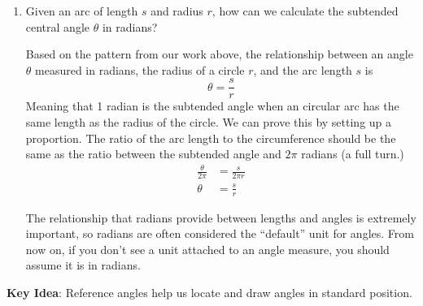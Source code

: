 \documentclass[main]{subfiles}
\begin{document}
\begin{enumerate}[resume]
\item 
\begin{problem}
Given an arc of length $s$ and radius $r$, how can we calculate the subtended central angle $\theta$ in radians?
\end{problem}
\pspace{\vfill}

\begin{solution}
    Based on the pattern from our work above, the relationship between an angle $\theta$ measured in radians, the radius of a circle $r$, and the arc length $s$ is \[\theta = \frac{s}{r}\]
    Meaning that 1 radian is the subtended angle when an circular arc has the same length as the radius of the circle. We can prove this by setting up a proportion. The ratio of the arc length to the circumference should be the same as the ratio between the subtended angle and $2\pi$ radians (a full turn.)
    \begin{align*}
        \frac{\theta}{2\pi} &= \frac{s}{2\pi r} \\[4pt]
        \theta &= \frac{s}{r}
    \end{align*}
\end{solution}

The relationship that radians provide between lengths and angles is extremely important, so radians are often considered the ``default'' unit for angles. From now on, if you don't see a unit attached to an angle measure, you should assume it is in radians.

\end{enumerate}

\pspace{\newpage}

\textbf{Key Idea}: Reference angles help us locate and draw angles in standard position.
\end{document}
